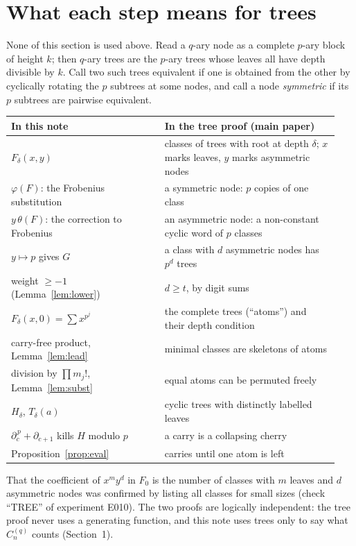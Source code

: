 \documentclass[11pt]{article}
\theoremstyle{definition}
\theoremstyle{remark}
\newcommand{\C}{C_n^{(q)}}
\begin{document}
\section{What each step means for trees}\label{sec:dict}

None of this section is used above. Read a $q$-ary node as a complete $p$-ary block of height
$k$; then $q$-ary trees are the $p$-ary trees whose leaves all have depth divisible by $k$.
Call two such trees equivalent if one is obtained from the other by cyclically rotating the
$p$ subtrees at some nodes, and call a node \emph{symmetric} if its $p$ subtrees are pairwise
equivalent.

\begin{center}
\begin{tabular}{p{0.44\linewidth}p{0.5\linewidth}}
\textbf{In this note} & \textbf{In the tree proof (main paper)}\\\hline
$F_\delta(x,y)$ & classes of trees with root at depth $\delta$; $x$ marks leaves, $y$ marks
                  asymmetric nodes\\
$\varphi(F)$: the Frobenius substitution & a symmetric node: $p$ copies of one class\\
$y\,\theta(F)$: the correction to Frobenius & an asymmetric node: a non-constant cyclic word
                  of $p$ classes\\
$y\mapsto p$ gives $G$ & a class with $d$ asymmetric nodes has $p^d$ trees\\
weight $\ge-1$ (Lemma~\ref{lem:lower}) & $d\ge t$, by digit sums\\
$F_\delta(x,0)=\sum x^{p^j}$ & the complete trees (``atoms'') and their depth condition\\
carry-free product, Lemma~\ref{lem:lead} & minimal classes are skeletons of atoms\\
division by $\prod m_j!$, Lemma~\ref{lem:subst} & equal atoms can be permuted freely\\
$H_\delta$, $T_\delta(a)$ & cyclic trees with distinctly labelled leaves\\
$\partial_c^{\,p}+\partial_{c+1}$ kills $H$ modulo $p$ & a carry is a collapsing cherry\\
Proposition~\ref{prop:eval} & carries until one atom is left\\
\end{tabular}
\end{center}

That the coefficient of $x^my^d$ in $F_0$ is the number of classes with $m$ leaves and $d$
asymmetric nodes was confirmed by listing all classes for small sizes (check ``TREE'' of
experiment E010). The two proofs are logically independent: the tree proof never uses a
generating function, and this note uses trees only to say what $\C$ counts (Section~1).
\end{document}
